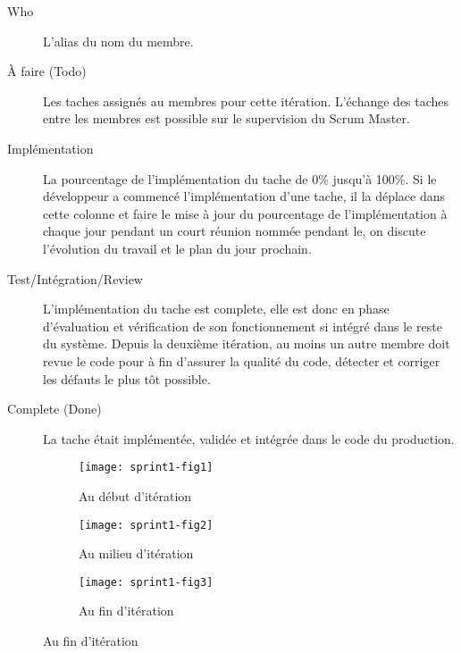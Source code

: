 \begin{description}
    \item [Who] L'alias du nom du membre.
    \item [À faire (Todo)] Les taches assignés au membres pour cette itération.
        L'échange des taches entre les membres est possible sur le supervision
        du Scrum Master.
    \item [Implémentation] La pourcentage de l'implémentation du tache de 0\%
        jusqu'à 100\%. Si le développeur a commencé l'implémentation d'une
        tache, il la déplace dans cette colonne et faire le mise à jour du
        pourcentage de l'implémentation à chaque jour pendant un court réunion
        nommée  pendant le, on discute l'évolution du
        travail et le plan du jour prochain.
    \item [Test/Intégration/Review] L'implémentation du tache est complete,
        elle est donc en phase d'évaluation et vérification de son
        fonctionnement si intégré dans le reste du système. Depuis la deuxième
        itération, au moins un autre membre doit revue le code pour à fin
        d'assurer la qualité du code, détecter et corriger les défauts le plus
        tôt possible.
    \item [Complete (Done)] La tache était implémentée, validée et intégrée
        dans le code du production.
\end{description}

\begin{figure}[htbp]
    \centering
    \caption{Évolution du travail}
    \begin{subfigure}{1\textwidth}
        \centering
        \texttt{[image: sprint1-fig1]}
        \caption{Au début d'itération}
        \label{fig:sprint1-fig1}
    \end{subfigure}

    \begin{subfigure}{1\textwidth}
        \centering
        \texttt{[image: sprint1-fig2]}
        \caption{Au milieu d'itération}
        \label{fig:sprint1-fig2}
    \end{subfigure}

    \begin{subfigure}{1\textwidth}
        \centering
        \texttt{[image: sprint1-fig3]}
        \caption{Au fin d'itération}
        \label{fig:sprint1-fig3}
    \end{subfigure}
\end{figure}
\clearpage

